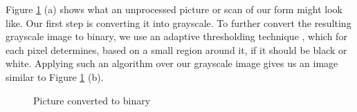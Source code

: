 \documentclass[11pt, a4paper]{report}
\begin{document}
Figure \ref{original-vs-processed-image} (a) shows what an unprocessed picture or scan of our form might look like. Our first step is converting it into grayscale. 
To further convert the resulting grayscale image to binary, we use an adaptive thresholding technique \cite{opencv-image-threshold}, which for each pixel determines, based on a small region around it, if it should be black or white. Applying such an algorithm over our grayscale image gives us an image similar to Figure \ref{original-vs-processed-image} (b).

\begin{figure}[!h]
	\hfill
	\hfill
	\caption{Picture converted to binary}
	\label{original-vs-processed-image}
\end{figure}



\end{document}
